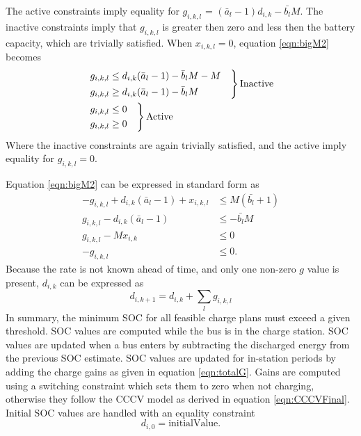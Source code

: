 The active constraints imply equality for $g_{i,k,l}$ = $(\bar{a}_l - 1)d_{i,k} - \bar{b_l}M$.  The inactive constraints imply that $g_{i,k,l}$ is greater then zero and less then the battery capacity, which are trivially satisfied. When $x_{i,k,l} = 0$, equation \ref{eqn:bigM2} becomes
\begin{equation}
	\begin{aligned}
		& \begin{rcases}
			g_{i,k,l} \le d_{i,k}(\bar{a}_l - 1) - \bar{b}_lM - M &\\
			g_{i,k,l} \ge d_{i,k}(\bar{a}_l - 1) - \bar{b}_lM &\\
		\end{rcases} \text{Inactive} \\
		& \begin{rcases}
			g_{i,k,l}\le 0 & \\
			g_{i,k,l}\ge 0 & \\ 
		\end{rcases}\text{Active}\\
	\end{aligned}
\end{equation}
Where the inactive constraints are again trivially satisfied, and the active imply equality for $g_{i,k,l} = 0$.

\par Equation \ref{eqn:bigM2} can be expressed in standard form as 
\begin{equation}\label{eqn:chargeConstraints}
	\begin{aligned} 
		-g_{i,k,l} + d_{i,k}(\bar{a}_l - 1) + x_{i,k,l} &\le M(\bar{b_l} + 1) \\
		 g_{i,k,l} - d_{i,k}(\bar{a}_l - 1)  &\le  - \bar{b_l}M \\
		 g_{i,k,l} - Mx_{i,k} &\le 0 \\
		-g_{i,k,l} &\le 0.  
	\end{aligned}
\end{equation} 
Because the rate is not known ahead of time, and only one non-zero $g$ value is present, $d_{i,k}$ can be expressed as 
\begin{equation}\label{eqn:totalG}
	d_{i,k + 1} = d_{i,k} + \sum_l g_{i,k,l} 
\end{equation}
In summary, the minimum SOC for all feasible charge plans must exceed a given threshold.  SOC values are computed while the bus is in the charge station.  SOC values are updated when a bus enters by subtracting the discharged energy from the previous SOC estimate. SOC values are updated for in-station periods by adding the charge gains as given in equation \ref{eqn:totalG}.  Gains are computed using a switching constraint which sets them to zero when not charging, otherwise they follow the CCCV model as derived in equation \ref{eqn:CCCVFinal}. Initial SOC values are handled with an equality constraint
\begin{equation}\label{eqn:initialSOC}
	d_{i,0} = \text{initialValue}.
\end{equation}

